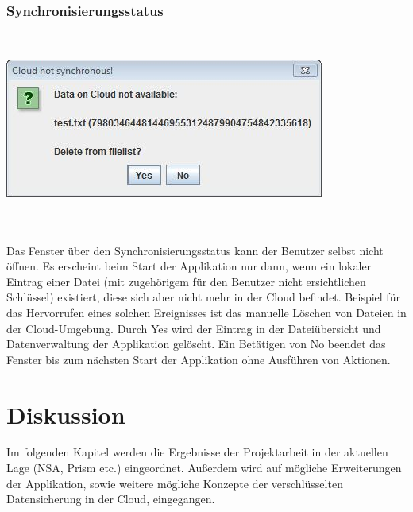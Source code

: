 \documentclass[13pt,a4paper,bibliography=totocnumbered,listof=totocnumbered]{scrartcl}
\begin{document}
\subsubsection{Synchronisierungsstatus}
$\;$\\
\begin{minipage}{\linewidth}
	\centering
	\includegraphics[width=0.4\linewidth]{./img/Synchron.jpg}
	\label{Synchron}
\end{minipage}
\\\\Das Fenster über den Synchronisierungsstatus kann der Benutzer selbst nicht öffnen. Es erscheint beim Start der Applikation nur dann, wenn ein lokaler Eintrag einer Datei (mit zugehörigem für den Benutzer nicht ersichtlichen Schlüssel) existiert, diese sich aber nicht mehr in der Cloud befindet. Beispiel für das Hervorrufen eines solchen Ereignisses ist das manuelle Löschen von Dateien in der Cloud-Umgebung. Durch Yes wird der Eintrag in der Dateiübersicht und Datenverwaltung der Applikation gelöscht. Ein Betätigen von No beendet das Fenster bis zum nächsten Start der Applikation ohne Ausführen von Aktionen.
\pagebreak

\section{Diskussion}\label{DiskussionV}
Im folgenden Kapitel werden die Ergebnisse der Projektarbeit in der aktuellen Lage (NSA, Prism etc.) eingeordnet. Außerdem wird auf mögliche Erweiterungen der Applikation, sowie weitere mögliche Konzepte der verschlüsselten Datensicherung in der Cloud, eingegangen. 
\end{document}
